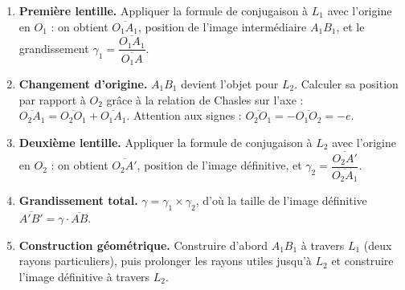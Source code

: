 \documentclass[11pt]{article}
\begin{document}
\begin{methode}
\begin{enumerate}
\item \textbf{Première lentille.} Appliquer la formule de conjugaison à $L_1$ avec l'origine en $O_1$ : on obtient $\overline{O_1A_1}$, position de l'image intermédiaire $A_1B_1$, et le grandissement $\gamma_1 = \dfrac{\overline{O_1A_1}}{\overline{O_1A}}$.
\item \textbf{Changement d'origine.} $A_1B_1$ devient l'objet pour $L_2$. Calculer sa position par rapport à $O_2$ grâce à la relation de Chasles sur l'axe : $\overline{O_2A_1} = \overline{O_2O_1} + \overline{O_1A_1}$. Attention aux signes : $\overline{O_2O_1} = -\overline{O_1O_2} = -e$.
\item \textbf{Deuxième lentille.} Appliquer la formule de conjugaison à $L_2$ avec l'origine en $O_2$ : on obtient $\overline{O_2A'}$, position de l'image définitive, et $\gamma_2 = \dfrac{\overline{O_2A'}}{\overline{O_2A_1}}$.
\item \textbf{Grandissement total.} $\gamma = \gamma_1 \times \gamma_2$, d'où la taille de l'image définitive $\overline{A'B'} = \gamma \cdot \overline{AB}$.
\item \textbf{Construction géométrique.} Construire d'abord $A_1B_1$ à travers $L_1$ (deux rayons particuliers), puis prolonger les rayons utiles jusqu'à $L_2$ et construire l'image définitive à travers $L_2$.
\end{enumerate}
\end{methode}
\end{document}
